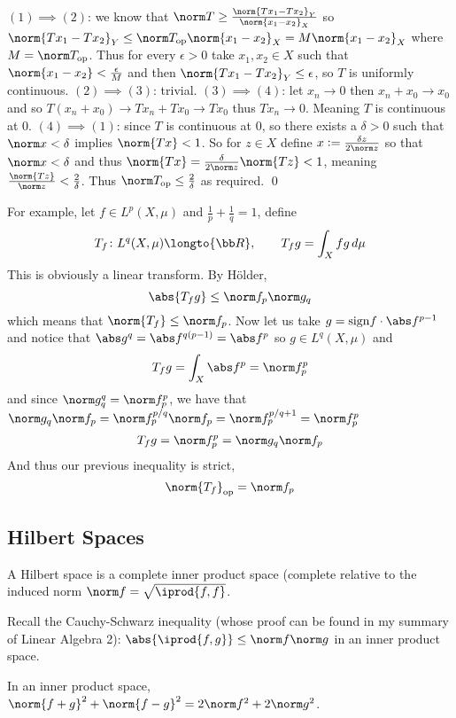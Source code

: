 \Proof $(1)\implies(2)$: we know that $\norm T\geq\frac{\norm{Tx_1-Tx_2}_Y}{\norm{x_1-x_2}_X}$ so $\norm{Tx_1-Tx_2}_Y\leq\norm T_{\rm op}\norm{x_1-x_2}_X=M\norm{x_1-x_2}_X$ where $M=\norm T_{\rm op}$.
Thus for every $\epsilon>0$ take $x_1,x_2\in X$ such that $\norm{x_1-x_2}<\frac\epsilon M$ and then $\norm{Tx_1-Tx_2}_Y\leq\epsilon$, so $T$ is uniformly continuous.
$(2)\implies(3)$: trivial.
$(3)\implies(4)$: let $x_n\to0$ then $x_n+x_0\to x_0$ and so $T(x_n+x_0)\to Tx_n+Tx_0\to Tx_0$ thus $Tx_n\to0$.
Meaning $T$ is continuous at $0$.
$(4)\implies(1)$: since $T$ is continuous at $0$, so there exists a $\delta>0$ such that $\norm x<\delta$ implies $\norm{Tx}<1$.
So for $z\in X$ define $x\coloneqq\frac{\delta z}{2\norm z}$ so that $\norm x<\delta$ and thus $\norm{Tx}=\frac\delta{2\norm z}\norm{Tz}<1$, meaning $\frac{\norm{Tz}}{\norm z}<\frac2\delta$.
Thus $\norm T_{\rm op}\leq\frac2\delta$ as required.
\qed

For example, let $f\in L^p(X,\mu)$ and $\frac1p+\frac1q=1$, define
$$ T_f\colon L^q(X,\mu)\longto{\bb R},\qquad T_fg = \int_X fg\,d\mu $$
This is obviously a linear transform.
By H\"older,
$$ \abs{T_fg} \leq \norm f_p\norm g_q $$
which means that $\norm{T_f}\leq\norm f_p$.
Now let us take $g={\rm sign}f\cdot\abs f^{p-1}$ and notice that $\abs g^q=\abs f^{q(p-1)}=\abs f^p$ so $g\in L^q(X,\mu)$ and
$$ T_fg = \int_X\abs f^p = \norm f_p^p $$
and since $\norm g_q^q=\norm f_p^p$, we have that $\norm g_q\norm f_p=\norm f_p^{p/q}\norm f_p=\norm f_p^{p/q+1}=\norm f_p^p$
$$ T_fg = \norm f_p^p = \norm g_q\norm f_p $$
And thus our previous inequality is strict,
$$ \norm{T_f}_{\rm op} = \norm f_p $$

\subsection{Hilbert Spaces}

\bdefn

    A {\emphcolor Hilbert space} is a complete inner product space (complete relative to the induced norm $\norm f=\sqrt{\iprod{f,f}}$.

\edefn

Recall the Cauchy-Schwarz inequality (whose proof can be found in my summary of Linear Algebra 2): $\abs{\iprod{f,g}}\leq\norm f\norm g$ in an inner product space.

\bprop[title=The Parallelogram Identity]

    In an inner product space, $\norm{f+g}^2+\norm{f-g}^2 = 2\norm f^2+2\norm g^2$.

